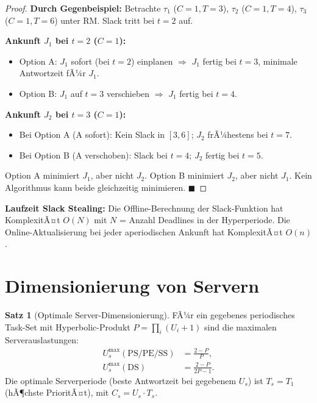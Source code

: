 ﻿\documentclass[a4paper,12pt]{report}
\theoremstyle{definition}
\newtheorem{satz}{Satz}[chapter]
\begin{document}
\begin{proof}
	\textbf{Durch Gegenbeispiel:} Betrachte $\tau_1$ ($C=1, T=3$), $\tau_2$ ($C=1, T=4$),
	$\tau_3$ ($C=1, T=6$) unter RM. Slack tritt bei $t=2$ auf.

	\textbf{Ankunft $J_1$ bei $t=2$ ($C=1$):}
	\begin{itemize}
		\item Option A: $J_1$ sofort (bei $t=2$) einplanen $\Rightarrow$ $J_1$ fertig bei $t=3$, minimale Antwortzeit fÃ¼r $J_1$.
		\item Option B: $J_1$ auf $t=3$ verschieben $\Rightarrow$ $J_1$ fertig bei $t=4$.
	\end{itemize}

	\textbf{Ankunft $J_2$ bei $t=3$ ($C=1$):}
	\begin{itemize}
		\item Bei Option A (A sofort): Kein Slack in $[3,6]$; $J_2$ frÃ¼hestens bei $t=7$.
		\item Bei Option B (A verschoben): Slack bei $t=4$; $J_2$ fertig bei $t=5$.
	\end{itemize}

	Option A minimiert $J_1$, aber nicht $J_2$.
	Option B minimiert $J_2$, aber nicht $J_1$.
	Kein Algorithmus kann beide gleichzeitig minimieren. \hfill$\blacksquare$
\end{proof}

\textbf{Laufzeit Slack Stealing:} Die Offline-Berechnung der Slack-Funktion
hat KomplexitÃ¤t $O(N)$ mit $N$ = Anzahl Deadlines in der Hyperperiode. Die
Online-Aktualisierung bei jeder aperiodischen Ankunft hat KomplexitÃ¤t $O(n)$.

\section{Dimensionierung von Servern}

\begin{satz}[Optimale Server-Dimensionierung]
	FÃ¼r ein gegebenes periodisches Task-Set mit Hyperbolic-Produkt $P = \prod_i(U_i+1)$
	sind die maximalen Serverauslastungen:
	\begin{align*}
		U_s^{\max}(\text{PS/PE/SS}) &= \frac{2-P}{P}, \\
		U_s^{\max}(\text{DS}) &= \frac{2-P}{2P-1}.
	\end{align*}
	Die optimale Serverperiode (beste Antwortzeit bei gegebenem $U_s$) ist
	$T_s = T_1$ (hÃ¶chste PrioritÃ¤t), mit $C_s = U_s \cdot T_s$.
\end{satz}
\end{document}
